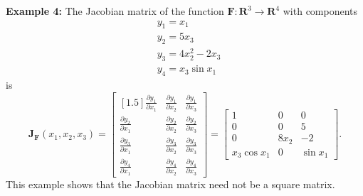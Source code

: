 \documentclass[14pt]{article}
\theoremstyle{definition}
\theoremstyle{remark}
\begin{document}
\textbf{Example 4:}
The Jacobian matrix of the function $\mathbf{F}: \mathbf{R}^3 \rightarrow \mathbf{R}^4$ with components
$$
    \begin{aligned}
         & y_1=x_1           \\
         & y_2=5 x_3         \\
         & y_3=4 x_2^2-2 x_3 \\
         & y_4=x_3 \sin x_1
    \end{aligned}
$$
is
\[
    \mathbf{J}_{\mathbf{F}}\left(x_1, x_2, x_3\right)=\begin{bmatrix}[1.5]
        \frac{\partial y_1}{\partial x_1} & \frac{\partial y_1}{\partial x_2} & \frac{\partial y_1}{\partial x_3} \\
        \frac{\partial y_2}{\partial x_1} & \frac{\partial y_2}{\partial x_2} & \frac{\partial y_2}{\partial x_3} \\
        \frac{\partial y_3}{\partial x_1} & \frac{\partial y_3}{\partial x_2} & \frac{\partial y_3}{\partial x_3} \\
        \frac{\partial y_4}{\partial x_1} & \frac{\partial y_4}{\partial x_2} & \frac{\partial y_4}{\partial x_3}
    \end{bmatrix}=\left[\begin{array}{ccc}
            1            & 0     & 0        \\
            0            & 0     & 5        \\
            0            & 8 x_2 & -2       \\
            x_3 \cos x_1 & 0     & \sin x_1
        \end{array}\right] .
\]
This example shows that the Jacobian matrix need not be a square matrix.
\end{document}
